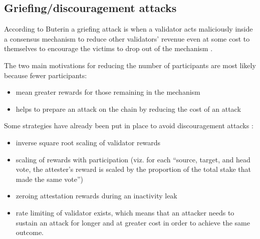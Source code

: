 \documentclass{article}
\begin{document}
%
%
%

\subsection{Griefing/discouragement attacks}
According to Buterin a griefing attack is when a validator acts maliciously
inside a consensus mechanism to reduce other validators' revenue even at some
cost to themselves to encourage the victims to drop out of the mechanism
\cite{buterin2018c}.

The two main motivations for reducing the number of participants are most
likely because fewer participants:
\begin{itemize}
  \item mean greater rewards for those remaining in the mechanism
  \item helps to prepare an attack on the chain by reducing the cost of an
    attack
\end{itemize}

Some strategies have already been put in place to avoid discouragement attacks
\cite{Edgington2023}:
\begin{itemize}
  \item inverse square root scaling of validator rewards
  \item scaling of rewards with participation (viz. for each ``source, target,
    and head vote, the attester's reward is scaled by the proportion of the
    total stake that made the same vote'')
  \item zeroing attestation rewards during an inactivity leak
  \item rate limiting of validator exists, which means that an attacker needs
    to sustain an attack for longer and at greater cost in order to achieve the
    same outcome.
\end{itemize}
\end{document}

